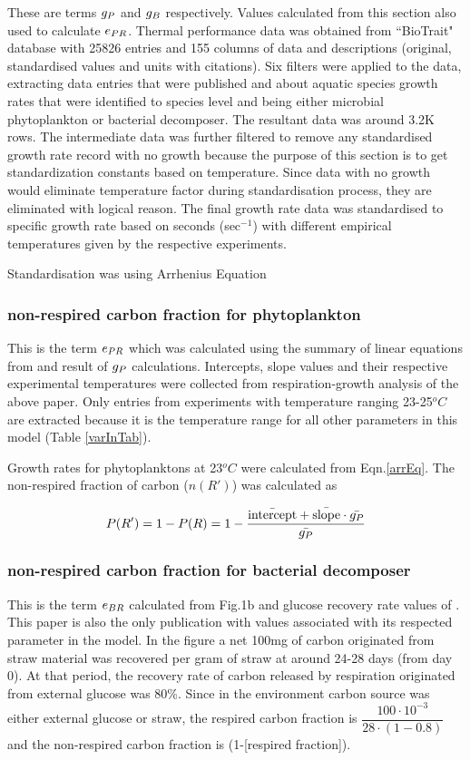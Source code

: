 \documentclass[../thesis.tex]{subfiles} %
\begin{document}
These are terms $g_P$ and $g_B$ respectively.  Values calculated from this section also used to calculate $e_{PR}$.  Thermal performance data was obtained from ``BioTrait" database\autocite{della2013thermal} with 25826 entries and 155 columns of data and descriptions (original, standardised values and units with citations).  Six filters were applied to the data, extracting data entries that were published and about aquatic species growth rates that were identified to species level and being either microbial phytoplankton or bacterial decomposer.  The resultant data was around 3.2K rows.  The intermediate data was further filtered to remove any standardised growth rate record with no growth because the purpose of this section is to get standardization constants based on temperature.  Since data with no growth would eliminate temperature factor during standardisation process, they are eliminated with logical reason.  The final growth rate data was standardised to specific growth rate based on seconds (sec$^{-1}$) with different empirical temperatures given by the respective experiments.

Standardisation was using Arrhenius Equation

\subsubsection{non-respired carbon fraction for phytoplankton}
This is the term $e_{PR}$ which was calculated using the summary of linear equations from \autocite{j1989respiration} and result of $g_P$ calculations.  Intercepts, slope values and their respective experimental temperatures were collected from respiration-growth analysis of the above paper.  Only entries from experiments with temperature ranging 23-25$^oC$ are extracted because it is the temperature range for all other parameters in this model (Table \ref{varInTab}).

Growth rates for phytoplanktons at 23$^oC$ were calculated from Eqn.\ref{arrEq}.  The non-respired fraction of carbon ($n(R')$) was calculated as

\begin{equation}
    P(R') = 1-P(R) = 1-\dfrac{\Bar{\text{intercept}}+\Bar{\text{slope}}\cdot\Bar{g_P}}{\Bar{g_P}}
    \label{ePReqn}
\end{equation}

\subsubsection{non-respired carbon fraction for bacterial decomposer}
This is the term $e_{BR}$ calculated from Fig.1b and glucose recovery rate values of \autocite{cochran1988estimation}.  This paper is also the only publication with values associated with its respected parameter in the model.  In the figure a net 100mg of carbon originated from straw material was recovered per gram of straw at around 24-28 days (from day 0).  At that period, the recovery rate of carbon released by respiration originated from external glucose was 80\%.  Since in the environment carbon source was either external glucose or straw, the respired carbon fraction is $\dfrac{100\cdot10^{-3}}{28\cdot(1-0.8)}$ and the non-respired carbon fraction is (1-[respired fraction]).
\end{document}
